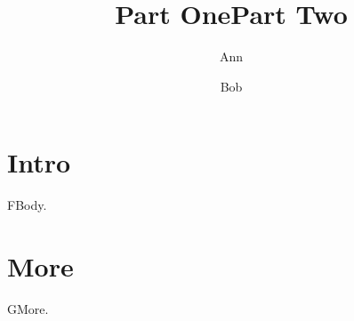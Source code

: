 \documentclass{beamer}
\title{Part One}\author{Ann}
\begin{document}
\frame{\titlepage}
\section{Intro}
\begin{frame}{F}Body.\end{frame}
\title{Part Two}\author{Bob}
\frame{\titlepage}
\section{More}
\begin{frame}{G}More.\end{frame}
\end{document}

